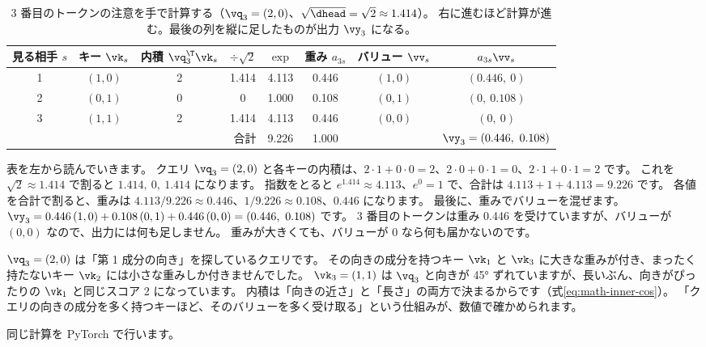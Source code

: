 \begin{table}[htbp]
\centering
\caption{3 番目のトークンの注意を手で計算する（$\vq_3=(2,0)$、$\sqrt{\dhead}=\sqrt2\approx1.414$）。
右に進むほど計算が進む。最後の列を縦に足したものが出力 $\vy_3$ になる。}
\label{tab:attn-hand}
\small
\setlength{\tabcolsep}{4pt}
\begin{tabular}{cccccccc}
\toprule
見る相手 $s$ & キー $\vk_s$ & 内積 $\vq_3^\T\vk_s$ & $\div\sqrt2$ & $\exp$ & 重み $a_{3s}$ & バリュー $\vv_s$ & $a_{3s}\vv_s$ \\
\midrule
1 & $(1,0)$ & 2 & 1.414 & 4.113 & 0.446 & $(1,0)$ & $(0.446,\ 0)$ \\
2 & $(0,1)$ & 0 & 0     & 1.000 & 0.108 & $(0,1)$ & $(0,\ 0.108)$ \\
3 & $(1,1)$ & 2 & 1.414 & 4.113 & 0.446 & $(0,0)$ & $(0,\ 0)$ \\
\midrule
\multicolumn{4}{r}{合計} & 9.226 & 1.000 & & $\vy_3=(0.446,\ 0.108)$ \\
\bottomrule
\end{tabular}
\end{table}

表を左から読んでいきます。
クエリ $\vq_3=(2,0)$ と各キーの内積は、$2\cdot1+0\cdot0=2$、$2\cdot0+0\cdot1=0$、$2\cdot1+0\cdot1=2$ です。
これを $\sqrt{2}\approx1.414$ で割ると $1.414,\ 0,\ 1.414$ になります。
指数をとると $e^{1.414}\approx4.113$、$e^{0}=1$ で、合計は $4.113+1+4.113=9.226$ です。
各値を合計で割ると、重みは $4.113/9.226\approx0.446$、$1/9.226\approx0.108$、$0.446$ になります。
最後に、重みでバリューを混ぜます。
$\vy_3 = 0.446\,(1,0) + 0.108\,(0,1) + 0.446\,(0,0) = (0.446,\ 0.108)$ です。
3 番目のトークンは重み 0.446 を受けていますが、バリューが $(0,0)$ なので、出力には何も足しません。
重みが大きくても、バリューが 0 なら何も届かないのです。

$\vq_3=(2,0)$ は「第 1 成分の向き」を探しているクエリです。
その向きの成分を持つキー $\vk_1$ と $\vk_3$ に大きな重みが付き、まったく持たないキー $\vk_2$ には小さな重みしか付きませんでした。
$\vk_3=(1,1)$ は $\vq_3$ と向きが 45° ずれていますが、長いぶん、向きがぴったりの $\vk_1$ と同じスコア 2 になっています。
内積は「向きの近さ」と「長さ」の両方で決まるからです（式\eqref{eq:math-inner-cos}）。
「クエリの向きの成分を多く持つキーほど、そのバリューを多く受け取る」という仕組みが、数値で確かめられます。

同じ計算を PyTorch で行います。


